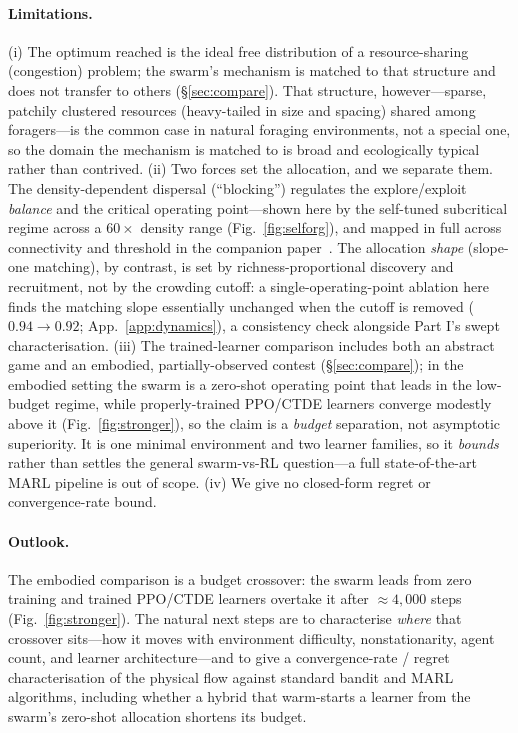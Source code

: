 \documentclass{article}
\begin{document}
\paragraph{Limitations.} (i) The optimum reached is the ideal free distribution of a resource-sharing
(congestion) problem; the swarm's mechanism is matched to that structure and does not transfer to others
(\S\ref{sec:compare}). That structure, however---sparse, patchily clustered resources (heavy-tailed in size and
spacing) shared among foragers---is the common case in natural foraging environments, not a special one, so the
domain the mechanism is matched to is broad and ecologically typical rather than contrived. (ii) Two forces set the allocation, and we separate them. The density-dependent dispersal
(``blocking'') regulates the explore/exploit \emph{balance} and the critical operating point---shown here by
the self-tuned subcritical regime across a $60\times$ density range (Fig.~\ref{fig:selforg}), and mapped in
full across connectivity and threshold in the companion paper~\citep{partI}. The allocation
\emph{shape} (slope-one matching), by contrast, is set by richness-proportional discovery and recruitment, not
by the crowding cutoff: a single-operating-point ablation here finds the matching slope essentially unchanged
when the cutoff is removed ($0.94\to0.92$; App.~\ref{app:dynamics}), a consistency check alongside Part I's
swept characterisation. (iii) The
trained-learner comparison includes both an abstract game and an embodied, partially-observed contest
(\S\ref{sec:compare}); in the embodied setting the swarm is a zero-shot operating point that leads in the
low-budget regime, while properly-trained PPO/CTDE learners converge modestly above it
(Fig.~\ref{fig:stronger}), so the claim is a \emph{budget} separation, not asymptotic superiority. It is one
minimal environment and two learner families, so it \emph{bounds} rather than settles the general swarm-vs-RL
question---a full state-of-the-art MARL pipeline is out of scope. (iv) We give no closed-form regret or
convergence-rate bound.

\paragraph{Outlook.} The embodied comparison is a budget crossover: the swarm leads from zero training and
trained PPO/CTDE learners overtake it after ${\approx}4{,}000$ steps (Fig.~\ref{fig:stronger}). The natural
next steps are to characterise \emph{where} that crossover sits---how it moves with environment difficulty,
nonstationarity, agent count, and learner architecture---and to give a convergence-rate / regret
characterisation of the physical flow against standard bandit and MARL algorithms, including whether a hybrid
that warm-starts a learner from the swarm's zero-shot allocation shortens its budget.
\end{document}
